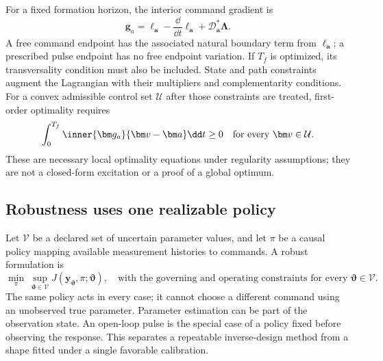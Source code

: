 For a fixed formation horizon, the interior command gradient is
\begin{equation}
 \bm g_a=\ell_{\bm a}
       -\frac{\dd}{\dd t}\ell_{\dot{\bm a}}
       +\mathcal D_{\bm a}^{\ast}\bm\Lambda.
 \label{eq:control-gradient}
\end{equation}
A free command endpoint has the associated natural boundary term from
$\ell_{\dot{\bm a}}$; a prescribed pulse endpoint has no free endpoint
variation. If $T_f$ is optimized, its transversality condition must also be
included. State and path constraints augment the Lagrangian with their
multipliers and complementarity conditions. For a convex admissible control
set $\mathcal U$ after those constraints are treated, first-order optimality
requires
\begin{equation}
 \int_0^{T_f}\inner{\bm g_a}{\bm v-\bm a}\dd t\geq0
       \quad\text{for every }\bm v\in\mathcal U.
 \label{eq:control-variational-inequality}
\end{equation}
These are necessary local optimality equations under regularity assumptions;
they are not a closed-form excitation or a proof of a global optimum.

\subsection{Robustness uses one realizable policy}
Let $\mathcal V$ be a declared set of uncertain parameter values, and let
$\pi$ be a causal policy mapping available measurement histories to commands.
A robust formulation is
\begin{equation}
 \min_\pi\ \sup_{\bm\vartheta\in\mathcal V}
       J(\bm y_{\bm\vartheta},\pi;\bm\vartheta),
 \quad\text{with the governing and operating constraints for every }
 \bm\vartheta\in\mathcal V.
 \label{eq:robust-design}
\end{equation}
The same policy acts in every case; it cannot choose a different command using
an unobserved true parameter. Parameter estimation can be part of the
observation state. An open-loop pulse is the special case of a policy fixed
before observing the response. This separates a repeatable inverse-design
method from a shape fitted under a single favorable calibration.
